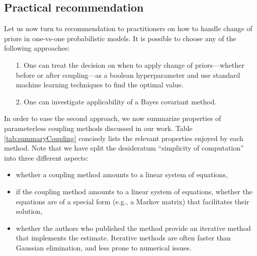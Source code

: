 \subsection{Practical recommendation}

Let us now turn to recommendation to practitioners on how to handle change of priors in one-vs-one probabilistic models. It is possible to choose any of the following approaches:

\begin{itemize}
\item[1.] One can treat the decision on when to apply change of priors---whether before or after coupling---as a boolean hyperparameter and use standard machine learning techniques to find the optimal value.
\item[2.] One can investigate applicability of a Bayes covariant method. 
\end{itemize}

In order to ease the second approach,   we now summarize properties of parameterless coupling methods discussed in our work.  Table \ref{tab:summaryCoupling} concisely lists the relevant properties enjoyed by each method. Note that we have split the desideratum ``simplicity of computation'' into three different aspects:
\begin{itemize}
	\item whether a coupling method amounts to a linear system of equations,
	\item if the coupling method amounts to a linear system of equations, whether the equations are of a special form (e.g., a Markov matrix) that facilitates their solution,
	\item whether the authors who published the method provide an iterative method that implements the estimate. Iterative methods are often  faster than Gaussian elimination, and less prone to numerical issues.
\end{itemize}




